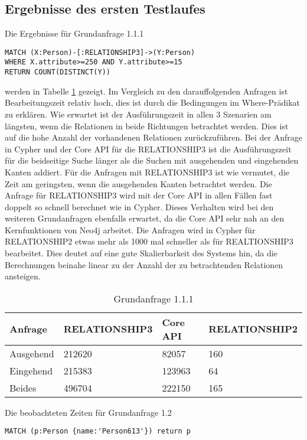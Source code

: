 \subsection{Ergebnisse des ersten Testlaufes}
Die Ergebnisse für Grundanfrage 1.1.1
\begin{Verbatim}[frame=single]
MATCH (X:Person)-[:RELATIONSHIP3]->(Y:Person) 
WHERE X.attribute>=250 AND Y.attribute>=15  
RETURN COUNT(DISTINCT(Y))
\end{Verbatim} 
 werden  in Tabelle \ref{tab:Query1_1} gezeigt. Im Vergleich zu den darauffolgenden Anfragen ist Bearbeitungszeit relativ hoch, dies ist durch die Bedingungen im Where-Prädikat zu erklären. Wie erwartet ist der Ausführungszeit in allen 3 Szenarien am längsten, wenn die Relationen in beide Richtungen betrachtet werden. Dies ist auf die hohe Anzahl der vorhandenen Relationen zurückzuführen. Bei der Anfrage in Cypher und der Core API für die RELATIONSHIP3  ist die Ausführungszeit für die beidseitige Suche länger als die Suchen mit ausgehenden und eingehenden Kanten addiert. Für die Anfragen mit RELATIONSHIP3 ist wie vermutet, die Zeit am geringsten, wenn die ausgehenden Kanten betrachtet werden. \newline
Die Anfrage für RELATIONSHIP3 wird mit der Core API in  allen Fällen fast doppelt so schnell berechnet wie in Cypher. Dieses Verhalten wird bei den weiteren Grundanfragen ebenfalls erwartet, da die Core API sehr nah an den Kernfunktionen von Neo4j arbeitet. \newline
Die Anfragen wird in Cypher für RELATIONSHIP2 etwas mehr als 1000 mal schneller als für REALTIONSHIP3 bearbeitet. Dies deutet auf eine gute Skalierbarkeit des Systems hin, da die Berechnungen beinahe linear zu der Anzahl der zu betrachtenden Relationen ansteigen. 
\FloatBarrier  
\begin{table}[h]
\centering
\begin{tabular}{ |p{3cm}||p{3cm}|p{3cm}|p{3cm}|  }
	\hline
	Anfrage& RELATIONSHIP3 &Core API&RELATIONSHIP2\\
	\hline
	Ausgehend	& 212620  & 82057   & 160\\
	Eingehend   & 215383    &123963&  64\\
	Beides&496704 & 222150&  165\\
	\hline
\end{tabular}
\caption{Grundanfrage 1.1.1}
\label{tab:Query1_1}
\end{table}
\FloatBarrier
 \noindent Die beobachteten Zeiten für Grundanfrage 1.2
 \begin{Verbatim}[frame=single]
 MATCH (p:Person {name:'Person613'}) return p
 \end{Verbatim} 
